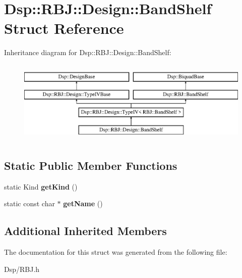 \hypertarget{structDsp_1_1RBJ_1_1Design_1_1BandShelf}{\section{Dsp\-:\-:R\-B\-J\-:\-:Design\-:\-:Band\-Shelf Struct Reference}
\label{structDsp_1_1RBJ_1_1Design_1_1BandShelf}
}
Inheritance diagram for Dsp\-:\-:R\-B\-J\-:\-:Design\-:\-:Band\-Shelf\-:\begin{figure}[H]
\begin{center}
\leavevmode
\includegraphics[height=4.000000cm]{structDsp_1_1RBJ_1_1Design_1_1BandShelf}
\end{center}
\end{figure}
\subsection*{Static Public Member Functions}
\begin{DoxyCompactItemize}
\item 
\hypertarget{structDsp_1_1RBJ_1_1Design_1_1BandShelf_a8b2edcbe587502172c7b6a2216c43806}{static Kind {\bfseries get\-Kind} ()}\label{structDsp_1_1RBJ_1_1Design_1_1BandShelf_a8b2edcbe587502172c7b6a2216c43806}

\item 
\hypertarget{structDsp_1_1RBJ_1_1Design_1_1BandShelf_a7f25bfc2d49d4de3fbf3a6eeab0858b7}{static const char $\ast$ {\bfseries get\-Name} ()}\label{structDsp_1_1RBJ_1_1Design_1_1BandShelf_a7f25bfc2d49d4de3fbf3a6eeab0858b7}

\end{DoxyCompactItemize}
\subsection*{Additional Inherited Members}


The documentation for this struct was generated from the following file\-:\begin{DoxyCompactItemize}
\item 
Dsp/R\-B\-J.\-h\end{DoxyCompactItemize}
